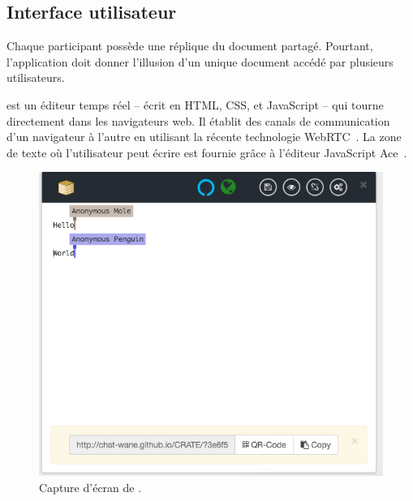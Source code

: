 \subsection{Interface utilisateur}

Chaque participant possède une réplique du document partagé. Pourtant,
l'application doit donner l'illusion d'un unique document accédé par plusieurs
utilisateurs.

\CRATE est un éditeur temps réel -- écrit en HTML, CSS, et JavaScript -- qui
tourne directement dans les navigateurs web. Il établit des canals de
communication d'un navigateur à l'autre en utilisant la récente technologie
WebRTC~\cite{webrtc}. La zone de texte où l'utilisateur peut écrire est fournie
grâce à l'éditeur JavaScript Ace~\cite{ace}.



\begin{figure}
  \begin{center}
    \includegraphics[scale=0.6]{img/editor/cratescreenshot.png}
    \caption[Capture d'écran de \CRATE]
    {\label{editor:img:screenshot}Capture d'écran de \CRATE.}
  \end{center}
\end{figure}

